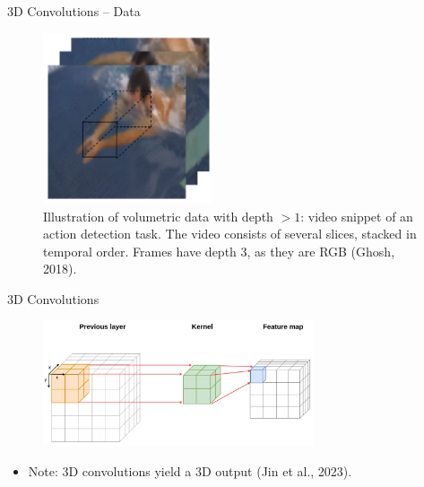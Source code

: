 \begin{vbframe}{3D Convolutions -- Data}
    \begin{figure}
        \centering
        \includegraphics[width=5cm]{plots/05_conv_variations/3d/swim.png}
        \caption{Illustration of volumetric data with depth $> 1$: video snippet of an action detection task. The video consists of several slices, stacked in temporal order. Frames have depth $3$, as they are RGB (Ghosh, 2018).}
    \end{figure}
\end{vbframe}

\begin{vbframe}{3D Convolutions}
    \begin{figure}
        \centering
        \includegraphics[width=8cm]{plots/05_conv_variations/3d/3dconv.png}
    \end{figure}
    \begin{itemize}
        \item Note: 3D convolutions yield a 3D output (Jin et al., 2023).
    \end{itemize}
\end{vbframe}

